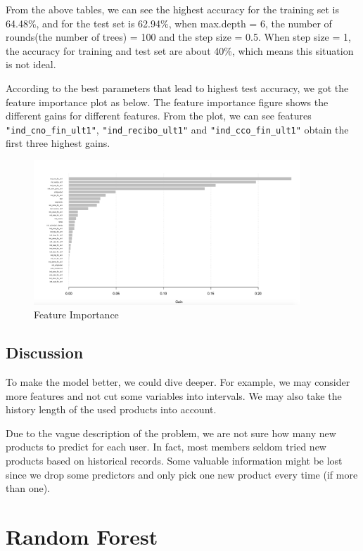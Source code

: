 \documentclass{article}
\begin{document}
\begin{spacing}{1}
\begin{large}
\noindent \indent From the above tables, we can see the highest accuracy for the training set is 64.48\%, and for the test set is 62.94\%, when max.depth = 6, the number of rounds(the number of trees) = 100 and the step size = 0.5.  When step size = 1, the accuracy for training and test set are about 40\%, which means this situation is not ideal.

\noindent \indent According to the best parameters that lead to highest test accuracy, we got the feature importance plot  as below. The feature importance figure shows the different gains for different features. From the plot, we can see features \verb|"ind_cno_fin_ult1"|, \verb|"ind_recibo_ult1"| and \verb|"ind_cco_fin_ult1"| obtain the first three highest gains.

\begin{figure}[H]
\centering
\includegraphics[width = 100mm]{113.png}
\caption{Feature Importance}
\end{figure}

\subsection{Discussion}

To make the model better, we could dive deeper. For example, we may consider more features and not cut some variables into intervals. We may also take the history length of the used products into account.

Due to the vague description of the problem, we are not sure how many new products to predict for each user. In fact, most members seldom tried new products based on historical records. Some valuable information might be lost since we drop some predictors and only pick one new product every time (if more than one).

\section{Random Forest}
	

\end{large}
\end{spacing}
\end{document}
